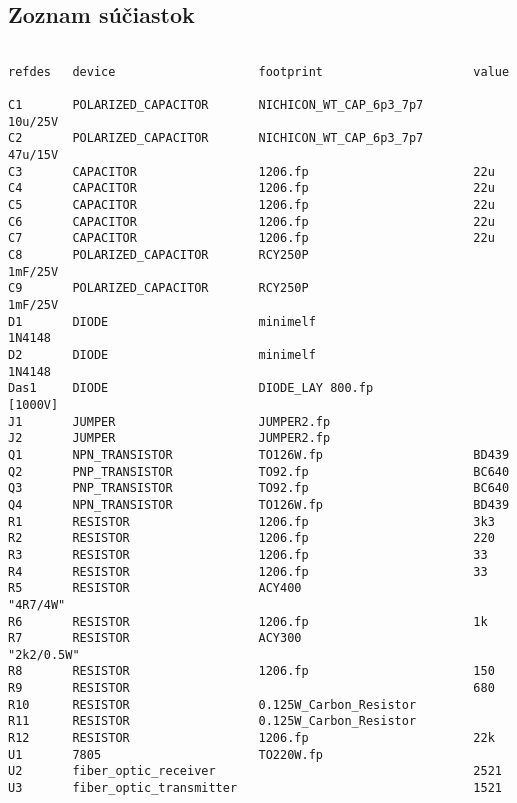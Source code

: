 \subsection{Zoznam súčiastok}
\small
\begin{verbatim}

refdes   device                    footprint                     value    

C1       POLARIZED_CAPACITOR       NICHICON_WT_CAP_6p3_7p7       10u/25V
C2       POLARIZED_CAPACITOR       NICHICON_WT_CAP_6p3_7p7       47u/15V
C3       CAPACITOR                 1206.fp                       22u
C4       CAPACITOR                 1206.fp                       22u
C5       CAPACITOR                 1206.fp                       22u
C6       CAPACITOR                 1206.fp                       22u
C7       CAPACITOR                 1206.fp                       22u
C8       POLARIZED_CAPACITOR       RCY250P                       1mF/25V
C9       POLARIZED_CAPACITOR       RCY250P                       1mF/25V
D1       DIODE                     minimelf                      1N4148
D2       DIODE                     minimelf                      1N4148
Das1     DIODE                     DIODE_LAY 800.fp              [1000V]
J1       JUMPER                    JUMPER2.fp                             
J2       JUMPER                    JUMPER2.fp                             
Q1       NPN_TRANSISTOR            TO126W.fp                     BD439    
Q2       PNP_TRANSISTOR            TO92.fp                       BC640    
Q3       PNP_TRANSISTOR            TO92.fp                       BC640    
Q4       NPN_TRANSISTOR            TO126W.fp                     BD439    
R1       RESISTOR                  1206.fp                       3k3      
R2       RESISTOR                  1206.fp                       220      
R3       RESISTOR                  1206.fp                       33       
R4       RESISTOR                  1206.fp                       33       
R5       RESISTOR                  ACY400                        "4R7/4W"          
R6       RESISTOR                  1206.fp                       1k       
R7       RESISTOR                  ACY300                        "2k2/0.5W"        
R8       RESISTOR                  1206.fp                       150
R9       RESISTOR                                                680
R10      RESISTOR                  0.125W_Carbon_Resistor                 
R11      RESISTOR                  0.125W_Carbon_Resistor                 
R12      RESISTOR                  1206.fp                       22k      
U1       7805                      TO220W.fp                              
U2       fiber_optic_receiver                                    2521     
U3       fiber_optic_transmitter                                 1521     
\end{verbatim}
\normalsize
\newpage
